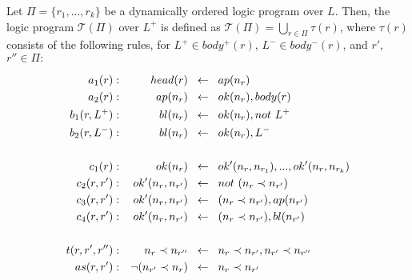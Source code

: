 \begin{definition}
  Let $\Pi = \{r_1, ..., r_k\}$ be a dynamically ordered logic program over $L$.
  Then, the logic program $\mathcal{T}(\Pi)$ over $L^+$ is defined as
  $\mathcal{T}(\Pi) = \bigcup_{r \in \Pi}\tau(r)$, where $\tau(r)$ consists of the
  following rules, for $L^+ \in body^+(r)$, $L^- \in body^-(r)$, and $r'$,
  $r'' \in \Pi:$\\
  \begin{minipage}{0.8\textwidth}
    \begin{align*}
      a_1(r): && head(r) \hspace*{0.2cm}&\leftarrow \hspace*{0.2cm} ap(n_r)\\
      a_2(r): && ap(n_r) \hspace*{0.2cm}&\leftarrow \hspace*{0.2cm} ok(n_r), body(r)\\
      b_1(r, L^+): && bl(n_r) \hspace*{0.2cm}&\leftarrow \hspace*{0.2cm} ok(n_r), not~L^+\\
      b_2(r, L^-): && bl(n_r) \hspace*{0.2cm}&\leftarrow \hspace*{0.2cm} ok(n_r), L^-\\
      \\
      c_1(r): && ok(n_r) \hspace*{0.2cm}&\leftarrow \hspace*{0.2cm} ok'(n_r, n_{r_1}), ..., ok'(n_r, n_{r_k})\\
      c_2(r, r'): && ok'(n_r, n_{r'}) \hspace*{0.2cm}&\leftarrow \hspace*{0.2cm} not~(n_r \prec n_{r'})\\
      c_3(r, r'): && ok'(n_r, n_{r'}) \hspace*{0.2cm}&\leftarrow \hspace*{0.2cm} (n_r \prec n_{r'}), ap(n_{r'})\\
      c_4(r, r'): && ok'(n_r, n_{r'}) \hspace*{0.2cm}&\leftarrow \hspace*{0.2cm} (n_r \prec n_{r'}), bl(n_{r'})\\
      \\
      t(r, r', r''): && n_r \prec n_{r''} \hspace*{0.2cm}&\leftarrow \hspace*{0.2cm} n_r \prec n_{r'}, n_{r'} \prec n_{r''}\\
      as(r, r'): && \neg (n_{r'} \prec n_{r}) \hspace*{0.2cm}&\leftarrow \hspace*{0.2cm} n_r \prec n_{r'}
    \end{align*}
  \end{minipage}
  \label{def:3}
\end{definition}

